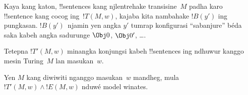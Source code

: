 \documentclass[../../../include/open-logic-section]{subfiles}
\begin{document}
\begin{enumerate}
\begin{enumerate}
\end{enumerate}
Kaya kang katon, !!{sentence}s kang njlentrehake
transisine~$M$ padha karo !!{sentence} kang cocog
ing~$!T(M,w)$, kajaba kita nambahake $!B(y')$
ing pungkasan. $!B(y')$~njamin yen angka $y'$
tumrap konfigurasi ``sabanjure'' béda saka kabeh
angka sadurunge $\Obj 0$, $\Obj 0'$, \dots.
\end{enumerate}
Tetepna $!T'(M, w)$ minangka konjungsi kabeh
!!{sentence}s ing ndhuwur kanggo mesin Turing~$M$
lan masukan~$w$.

\begin{lem}
  Yen $M$ kang diwiwiti nganggo masukan~$w$ mandheg,
  mula $!T'(M,w) \land !E(M,w)$ nduwé model winates.
\end{lem}
\end{document}
